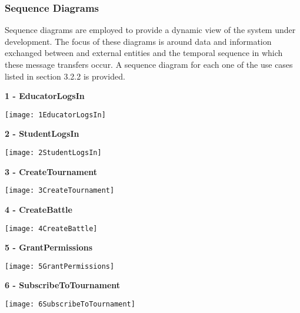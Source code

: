 \begin{minipage}{\textwidth}
\subsubsection{Sequence Diagrams}
Sequence diagrams are employed to provide a dynamic view of the system under development. The focus of these diagrams is around data and information exchanged between \app and external entities and the temporal sequence in which these message transfers occur.
A sequence diagram for each one of the use cases listed in section 3.2.2 is provided.\\

\vspace{0.5cm}


\textbf{1 - EducatorLogsIn}
\begin{center}
	\texttt{[image: 1EducatorLogsIn]}
\end{center}

\vspace*{1cm}

\textbf{2 - StudentLogsIn}
\begin{center}
	\texttt{[image: 2StudentLogsIn]}
\end{center}
\end{minipage}

\begin{minipage}{\textwidth}
	\textbf{3 - CreateTournament}
	\begin{center}
		\texttt{[image: 3CreateTournament]}
	\end{center}

\vspace{1cm}

	\textbf{4 - CreateBattle}
	\begin{center}
		\texttt{[image: 4CreateBattle]}
	\end{center}
\end{minipage}

\begin{minipage}{\textwidth}
	\textbf{5 - GrantPermissions}
	\begin{center}
		\texttt{[image: 5GrantPermissions]}
	\end{center}

\vspace*{1cm}

	\textbf{6 - SubscribeToTournament}
	\begin{center}
		\texttt{[image: 6SubscribeToTournament]}
	\end{center}
\end{minipage}

